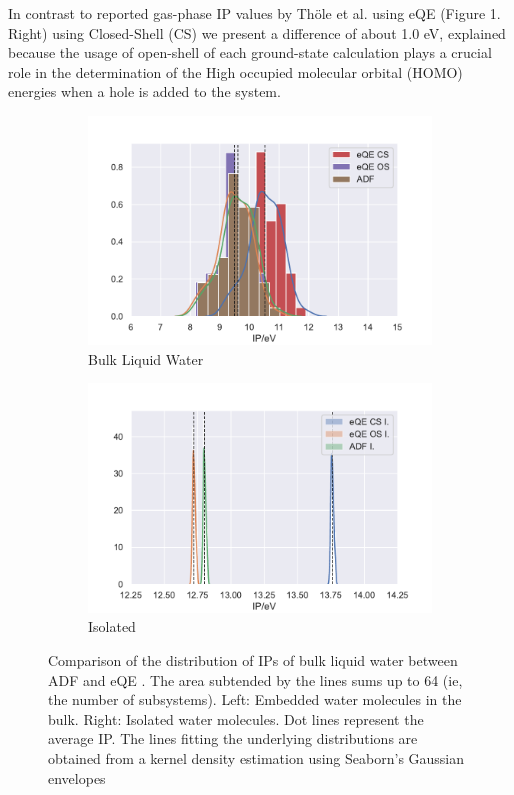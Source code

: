 \documentclass[12pt,a4paper]{article}
\begin{document}
In contrast to reported gas-phase IP values by Th{\"o}le et al.\cite{tolle2019charged} using eQE (Figure 1. Right) using Closed-Shell (CS)
we present a difference of about 1.0 eV, explained because the usage of open-shell of each ground-state calculation plays a crucial role in the determination of the  High occupied molecular orbital (HOMO) energies when a hole is added to the system. \\

\begin{figure}[!ht]
        \captionsetup[subfigure]{labelformat=empty}
        \centering
        \begin{subfigure}{0.4\linewidth}
                \includegraphics[width=\linewidth]{images/bulk-eqe-adf}
                \caption{Bulk Liquid Water}
        \end{subfigure}
        \begin{subfigure}{0.4\linewidth}
                \includegraphics[width=\linewidth]{images/Iso-eqe-adf}
                \caption{Isolated}
        \end{subfigure}
        \caption{Comparison of the distribution of IPs of bulk liquid water between ADF\cite{te2001chemistry} and eQE \cite{genova2017eqe}. The area subtended by the lines sums up to 64 (ie, the number of subsystems). Left: Embedded water molecules in the bulk. Right: Isolated water molecules. Dot lines represent the average IP. The lines fitting the underlying distributions are obtained from a kernel density estimation using Seaborn's Gaussian envelopes\cite{waskom2017c}}
\end{figure}
\end{document}
